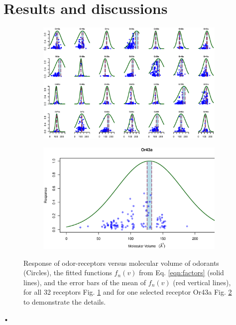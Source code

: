 \documentclass[11pt]{paper} %
\newcommand{\numberofreceptors}{32 }
\begin{document}
\section{Results and discussions}
\begin{figure}
	\centering
	\begin{subfigure}[b]{\textwidth}
		\includegraphics[width=\textwidth]{fig/vol-res}
		\caption{}
		\label{fig:vol-res:all}		
	\end{subfigure}
	\begin{subfigure}[b]{0.75 \textwidth}
		\includegraphics[width= \textwidth]{fig/vol-res-Or43a}
		\caption{}	
		\label{fig:vol-res:one}	
	\end{subfigure}
	\caption{Response of odor-receptors  versus molecular volume of odorants (Circles), the fitted functions $f_n(v)$ from Eq. \ref{eqn:factors} (solid lines), 
		and the error bars of the mean of $f_n(v)$ (red vertical lines),
		for all \numberofreceptors receptors Fig. \ref{fig:vol-res:all} and for one selected receptor Or43a Fig. \ref{fig:vol-res:one} to demonstrate the details. }
	\label{fig:vol-res}
\end{figure}•
\end{document}
